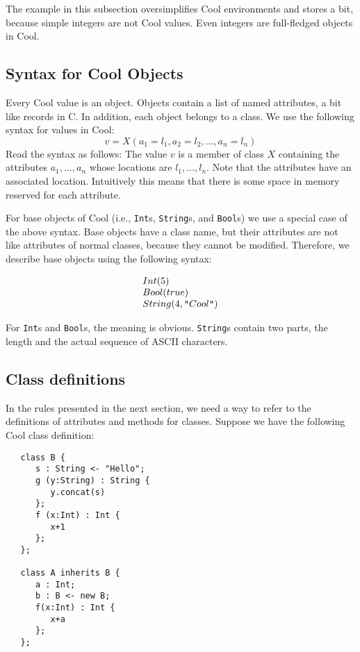 \documentclass[11pt]{article}
\newcommand {\m}{\mbox}
\newcommand{\dq}{\m{\tt "}}
\def\C#1{{\tt{}#1}}
\begin{document}
The example in this subsection oversimplifies Cool environments and
stores a bit, because simple integers are not Cool values.
Even integers are full-fledged objects in Cool.


\subsection{Syntax for Cool Objects}
\label{objectsyntax}
Every Cool value is an object.
 Objects contain a list of
named attributes, a bit like records in C.  In addition, each object belongs to a class. We use
the following syntax for values in Cool:
\[
	v = X(a_1=l_1,a_2=l_2,\ldots,a_n=l_n)
\]
Read the syntax as follows: The value $v$ is a member of class $X$ containing the attributes
$a_1, \ldots, a_n$ whose locations are $l_1, \ldots, l_n$. Note that
the attributes have an associated location. Intuitively this means
that there is some space in memory reserved for each attribute.

For base objects of Cool (i.e., \C{Int}s, \C{String}s, and \C{Bool}s) we use a
special case of the above syntax. Base objects have a class
name, but their attributes are not like attributes of normal
classes, because they cannot be modified. Therefore, we describe
base objects using the following syntax:

\[
\begin{array}{l}
	Int(5)\\
	Bool(true)\\
	String(4,\dq Cool \dq)
\end{array}
\]

For \C{Int}s and \C{Bool}s, the meaning is obvious. \C{String}s contain two
parts, the length and the actual sequence of ASCII characters.

\subsection{Class definitions}
\label{classdefs}
In the rules presented in the next section, we need a way to refer to
the definitions of attributes and methods for classes. 
Suppose we have the following Cool class
definition:
\begin{verbatim}
   class B {
      s : String <- "Hello";
      g (y:String) : String {
         y.concat(s)
      };
      f (x:Int) : Int {
         x+1
      };
   };

   class A inherits B {
      a : Int;
      b : B <- new B;
      f(x:Int) : Int {
         x+a
      };
   };
\end{verbatim}
\end{document}
